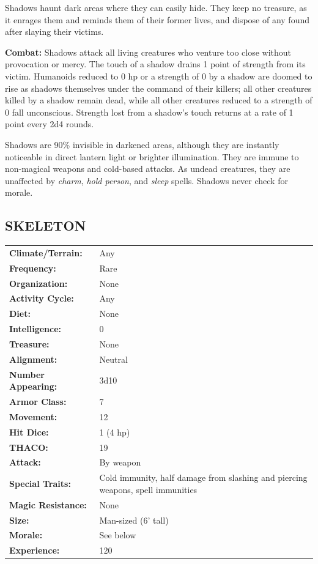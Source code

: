 \begin{multicols}{2}
Shadows haunt dark areas where they can easily hide. They keep no treasure, as it enrages them and reminds them of their former lives, and dispose of any found after slaying their victims.

\textbf{Combat:} Shadows attack all living creatures who venture too close without provocation or mercy. The touch of a shadow drains 1 point of strength from its victim. Humanoids reduced to 0 hp or a strength of 0 by a shadow are doomed to rise as shadows themselves under the command of their killers; all other creatures killed by a shadow remain dead, while all other creatures reduced to a strength of 0 fall unconscious. Strength lost from a shadow's touch returns at a rate of 1 point every 2d4 rounds.

Shadows are 90\% invisible in darkened areas, although they are instantly noticeable in direct lantern light or brighter illumination. They are immune to non-magical weapons and cold-based attacks. As undead creatures, they are unaffected by \textit{charm}, \textit{hold person}, and \textit{sleep} spells. Shadows never check for morale.

\noindent
\begin{minipage}{\columnwidth}

\vspace{1em}

\subsection{SKELETON}

\noindent \begin{tabular}{p{}p{}}
\textbf{Climate/Terrain:}	& Any	\\
\textbf{Frequency:} 		& Rare	\\
\textbf{Organization:} 		& None	\\
\textbf{Activity Cycle:} 	& Any	\\
\textbf{Diet:} 				& None	\\
\textbf{Intelligence:} 		& 0	\\
\textbf{Treasure:} 			& None	\\
\textbf{Alignment:} 		& Neutral	\\
\hline
\textbf{Number Appearing:} 	& 3d10	\\
\textbf{Armor Class:} 		& 7	\\
\textbf{Movement:} 			& 12	\\
\textbf{Hit Dice:} 			& 1 (4 hp)	\\
\textbf{THACO:} 			& 19	\\
\textbf{Attack:} 			& By weapon	\\
\textbf{Special Traits:} & Cold immunity, half damage from slashing and piercing weapons, spell immunities	\\
\textbf{Magic Resistance:} 	& None	\\
\textbf{Size:} 				& Man-sized (6' tall)	\\
\textbf{Morale:} 			& See below	\\
\textbf{Experience:} 		& 120	\\ %
\end{tabular}


\end{minipage}
\end{multicols}
